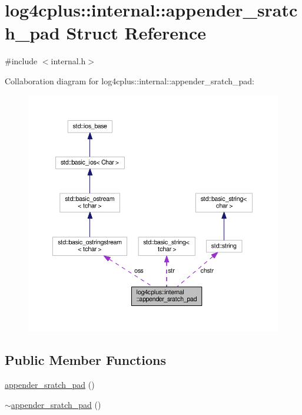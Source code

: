 \hypertarget{structlog4cplus_1_1internal_1_1appender__sratch__pad}{\section{log4cplus\-:\-:internal\-:\-:appender\-\_\-sratch\-\_\-pad Struct Reference}
\label{structlog4cplus_1_1internal_1_1appender__sratch__pad}
}


{\ttfamily \#include $<$internal.\-h$>$}



Collaboration diagram for log4cplus\-:\-:internal\-:\-:appender\-\_\-sratch\-\_\-pad\-:
\nopagebreak
\begin{figure}[H]
\begin{center}
\leavevmode
\includegraphics[width=350pt]{structlog4cplus_1_1internal_1_1appender__sratch__pad__coll__graph}
\end{center}
\end{figure}
\subsection*{Public Member Functions}
\begin{DoxyCompactItemize}
\item 
\hyperlink{structlog4cplus_1_1internal_1_1appender__sratch__pad_ab516861b0a5355308d969e2aa6b9fbfa}{appender\-\_\-sratch\-\_\-pad} ()
\item 
\hyperlink{structlog4cplus_1_1internal_1_1appender__sratch__pad_a94bf1e78d6efdc6f75941eec937e1f41}{$\sim$appender\-\_\-sratch\-\_\-pad} ()
\end{DoxyCompactItemize}

